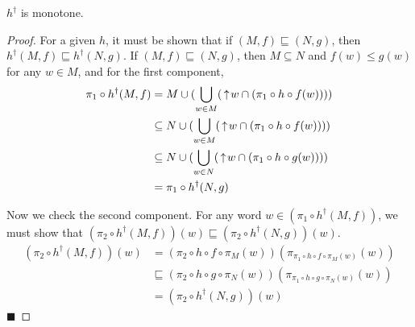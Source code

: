 \begin{proposition}
$h^\dagger$ is monotone.
\end{proposition}
\begin{proof}
For a given $h$, it must be shown that if $(M,f) \sqsubseteq (N,g)$, then $h^{\dagger}(M,f) \sqsubseteq h^{\dagger}(N,g)$.
If $(M, f)\sqsubseteq (N, g)$, then $M\subseteq N$
and $f(w)\leq g(w)$ for any 
$w\in M$, and for the first component,
\begin{align*}
\pi_1\circ h^\dagger(M, f) &= M \cup (\bigcup_{w\in M} (\,\uparrow\! w \cap (\pi_1 \circ h\circ f(w)))) \\
&\subseteq N \cup (\bigcup_{w\in M} (\,\uparrow\! w \cap (\pi_1 \circ h\circ f(w)))) \\
&\subseteq N \cup (\bigcup_{w\in N} (\,\uparrow\! w \cap (\pi_1 \circ h\circ g(w)))) \\
&= \pi_1\circ h^\dagger(N, g)
\end{align*}

Now we check the second component.  For any word $w\in(\pi_1\circ h^\dagger(M,f))$,
we must show that $(\pi_2\circ h^\dagger(M,f))(w) \sqsubseteq (\pi_2\circ h^\dagger(N,g))(w)$.
\begin{align*}
(\pi_2\circ h^\dagger(M,f))(w) &= (\pi_2\circ h\circ f\circ\pi_M(w))(\pi_{\pi_1\circ h\circ f\circ\pi_M(w)}(w)) \\
& \sqsubseteq (\pi_2\circ h\circ g\circ\pi_N(w))(\pi_{\pi_1\circ h\circ g\circ\pi_N(w)}(w)) \\ 
&= (\pi_2\circ h^\dagger(N,g))(w)
\end{align*} \hfill$\blacksquare$
\end{proof}

